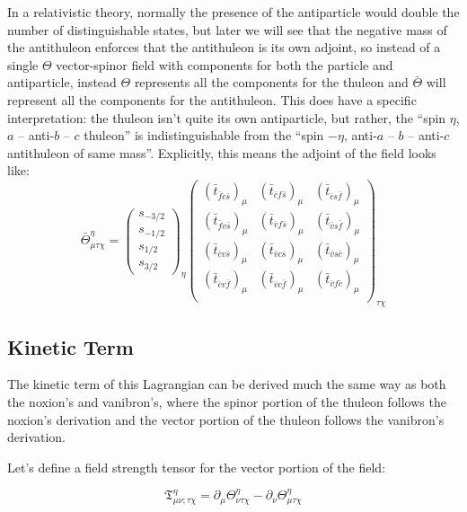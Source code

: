 In a relativistic theory, normally the presence of the antiparticle would double the number of distinguishable states, but later we will see that the negative mass of the antithuleon enforces that the antithuleon is its own adjoint, so instead of a single \(\Theta\) vector-spinor field with components for both the particle and antiparticle, instead \(\Theta\) represents all the components for the thuleon and \(\bar{\Theta}\) will represent all the components for the antithuleon. This does have a specific interpretation: the thuleon isn't quite its own antiparticle, but rather, the ``spin \(\eta\), \(a\) -- anti-\(b\) -- \(c\) thuleon'' is indistinguishable from the ``spin \(-\eta\), anti-\(a\) -- \(b\) -- anti-\(c\) antithuleon of same mass''. Explicitly, this means the adjoint of the field looks like:
\[
  \bar{\Theta}^{\eta}_{\mu \tau \chi}
  =
  \begin{pmatrix}s_{-3/2}\\s_{-1/2}\\s_{1/2}\\s_{3/2}\end{pmatrix}_{\eta}
  \begin{pmatrix}
    \left(\bar{t}_{\bar{f} c \bar{s}}\right)_{\mu} & \left(\bar{t}_{\bar{c} f \bar{s}}\right)_{\mu} & \left(\bar{t}_{\bar{c} s \bar{f}}\right)_{\mu} \\
    \left(\bar{t}_{\bar{f} v \bar{s}}\right)_{\mu} & \left(\bar{t}_{\bar{v} f \bar{s}}\right)_{\mu} & \left(\bar{t}_{\bar{v} s \bar{f}}\right)_{\mu} \\
    \left(\bar{t}_{\bar{c} v \bar{s}}\right)_{\mu} & \left(\bar{t}_{\bar{v} c \bar{s}}\right)_{\mu} & \left(\bar{t}_{\bar{v} s \bar{c}}\right)_{\mu} \\
    \left(\bar{t}_{\bar{c} v \bar{f}}\right)_{\mu} & \left(\bar{t}_{\bar{v} c \bar{f}}\right)_{\mu} & \left(\bar{t}_{\bar{v} f \bar{c}}\right)_{\mu} \\
  \end{pmatrix}_{\tau \chi}
\]

\subsection{Kinetic Term}

The kinetic term of this Lagrangian can be derived much the same way as both the noxion's and vanibron's, where the spinor portion of the thuleon follows the noxion's derivation and the vector portion of the thuleon follows the vanibron's derivation.

Let's define a field strength tensor for the vector portion of the field:
\begin{definition}
  \[
    \mathfrak{T}^{\eta}_{\mu \nu ; \tau \chi} = \partial_{\mu}\Theta^{\eta}_{\nu \tau \chi} - \partial_{\nu}\Theta^{\eta}_{\mu \tau \chi}
  \]
\end{definition}

